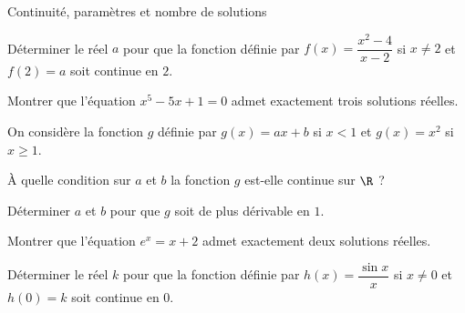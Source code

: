 
\begin{exercice}[3]{Continuité, paramètres et nombre de solutions}
\begin{questions}
  \item Déterminer le réel $a$ pour que la fonction définie par $f(x)=\dfrac{x^{2}-4}{x-2}$ si $x\neq2$ et $f(2)=a$ soit continue en $2$.
  \item Montrer que l'équation $x^{5}-5x+1=0$ admet exactement trois solutions réelles.
  \item On considère la fonction $g$ définie par $g(x)=ax+b$ si $x<1$ et $g(x)=x^{2}$ si $x\geq1$.
    \begin{questions}
      \item À quelle condition sur $a$ et $b$ la fonction $g$ est-elle continue sur $\R$ ?
      \item Déterminer $a$ et $b$ pour que $g$ soit de plus dérivable en $1$.
    \end{questions}
  \item Montrer que l'équation $e^{x}=x+2$ admet exactement deux solutions réelles.
  \item Déterminer le réel $k$ pour que la fonction définie par $h(x)=\dfrac{\sin x}{x}$ si $x\neq0$ et $h(0)=k$ soit continue en $0$.
\end{questions}
\end{exercice}

